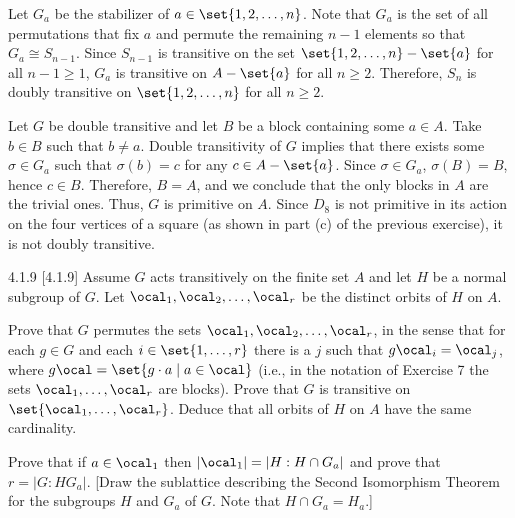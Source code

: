 \begin{solenum}
	\item Let $G_a$ be the stabilizer of $a \in \set{1, 2, \ldots, n}$.
	Note that $G_a$ is the set of all permutations that fix $a$ and permute the remaining $n - 1$ elements so that $G_a \cong S_{n - 1}$.
	Since $S_{n - 1}$ is transitive on the set $\set{1, 2, \ldots, n} - \set{a}$ for all $n - 1 \geq 1$, $G_a$ is transitive on $A - \set{a}$ for all $n \geq 2$.
	Therefore, $S_n$ is doubly transitive on $\set{1, 2, \ldots, n}$ for all $n \geq 2$.
	\item Let $G$ be double transitive and let $B$ be a block containing some $a \in A$.
	Take $b \in B$ such that $b \neq a$.
	Double transitivity of $G$ implies that there exists some $\sigma \in G_a$ such that $\sigma(b) = c$ for any $c \in A - \set{a}$.
	Since $\sigma \in G_a$, $\sigma(B) = B$, hence $c \in B$.
	Therefore, $B = A$, and we conclude that the only blocks in $A$ are the trivial ones.
	Thus, $G$ is primitive on $A$.
	Since $D_8$ is not primitive in its action on the four vertices of a square (as shown in part (c) of the previous exercise), it is not doubly transitive.
\end{solenum}

\begin{spex}{4.1.9}
	[4.1.9] Assume $G$ acts transitively on the finite set $A$ and let $H$ be a normal subgroup of $G$.
	Let $\ocal_1, \ocal_2, \ldots, \ocal_r$ be the distinct orbits of $H$ on $A$.
	\begin{subexercises}
		\item Prove that $G$ permutes the sets $\ocal_1, \ocal_2, \ldots, \ocal_r$, in the sense that for each $g \in G$ and each $i \in \set{1,\ldots,r}$ there is a $j$ such that $g \ocal_i = \ocal_j$, where $g\ocal = \set{g \cdot a \mid a \in \ocal}$ (i.e., in the notation of Exercise 7 the sets $\ocal_1, \ldots, \ocal_r$ are blocks).
		Prove that $G$ is transitive on $\set{\ocal_1, \ldots, \ocal_r}$.
		Deduce that all orbits of $H$ on $A$ have the same cardinality.
		\item Prove that if $a \in \ocal_1$ then $|\ocal_1| = |H : H \cap G_a|$ and prove that $r = |G : HG_a|$. [Draw the sublattice describing the Second Isomorphism Theorem for the subgroups $H$ and $G_a$ of $G$.
		Note that $H \cap G_a = H_a$.]
	\end{subexercises}
\end{spex}

